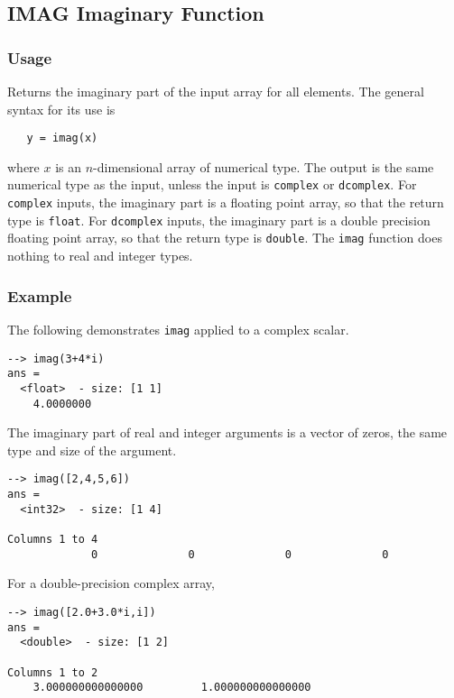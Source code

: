 %
%
%
\subsection{IMAG Imaginary Function}
\subsubsection{Usage}
Returns the imaginary part of the input array for all elements.  The 
general syntax for its use is
\begin{verbatim}
   y = imag(x)
\end{verbatim}
where $x$ is an $n$-dimensional array of numerical type.  The output 
is the same numerical type as the input, unless the input is \verb|complex|
or \verb|dcomplex|.  For \verb|complex| inputs, the imaginary part is a floating
point array, so that the return type is \verb|float|.  For \verb|dcomplex|
inputs, the imaginary part is a double precision floating point array, so that
the return type is \verb|double|.  The \verb|imag| function does
nothing to real and integer types.
\subsubsection{Example}
The following demonstrates \verb|imag| applied to a complex scalar.
\begin{verbatim}
--> imag(3+4*i)
ans =
  <float>  - size: [1 1]
    4.0000000
\end{verbatim}
The imaginary part of real and integer arguments is a vector of zeros, the
same type and size of the argument.
\begin{verbatim}
--> imag([2,4,5,6])
ans =
  <int32>  - size: [1 4]
  
Columns 1 to 4
             0              0              0              0
\end{verbatim}
For a double-precision complex array,
\begin{verbatim}
--> imag([2.0+3.0*i,i])
ans =
  <double>  - size: [1 2]
  
Columns 1 to 2
    3.000000000000000         1.000000000000000
\end{verbatim}
